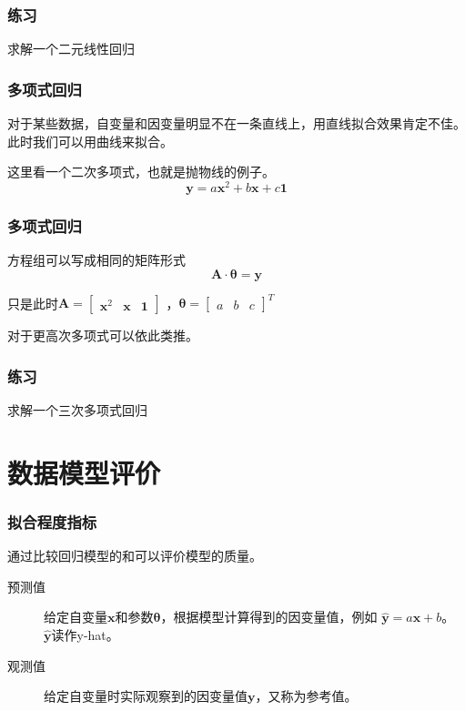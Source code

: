 \documentclass[14pt]{beamer}
\newcommand{\mat}[1]{\bm{#1}}
\renewcommand{\vec}[1]{\bm{#1}}
\newcommand{\MA}{\mat{A}}
\newcommand{\Vy}{\vec{y}}
\newcommand{\Vx}{\vec{x}}
\newcommand{\Vt}{\vec{\theta}}
\let\emph\relax %
\begin{document}
    \begin{frame}
        \frametitle{练习}
        求解一个二元线性回归
    \end{frame}

    \begin{frame}
        \frametitle{多项式回归}
        对于某些数据，自变量和因变量明显不在一条直线上，用直线拟合效果肯定不佳。
        此时我们可以用\emph{多项式}曲线来拟合。

        这里看一个二次多项式，也就是抛物线的例子。
        \begin{equation}
            \Vy = a\Vx^2+b\Vx+c\vec{1}
        \end{equation}
    \end{frame}

    \begin{frame}
        \frametitle{多项式回归}
        方程组可以写成相同的矩阵形式
        \begin{equation}
            \MA\cdot\Vt=\Vy
        \end{equation}
        
        只是此时$\MA=\begin{bmatrix}
                \Vx^2 & \Vx & \vec{1}
            \end{bmatrix}$
            ，$\Vt=\begin{bmatrix}a&b&c\end{bmatrix}^T$

        对于更高次多项式可以依此类推。
    \end{frame}

    \begin{frame}
        \frametitle{练习}
        求解一个三次多项式回归
    \end{frame}

    \section{数据模型评价}

    \begin{frame}
        \frametitle{拟合程度指标}
        通过比较回归模型的\emph{预测值}和\emph{观测值}可以评价模型的质量。
        \begin{description}
            \item[预测值] 给定自变量$\Vx$和参数$\Vt$，根据模型计算得到的因变量值，例如
            $\hat{\Vy}=a\Vx+b$。 $\hat{\Vy}$读作y-hat。
            \item[观测值] 给定自变量时实际观察到的因变量值$\Vy$，又称为参考值。 
        \end{description}
    \end{frame}
\end{document}
